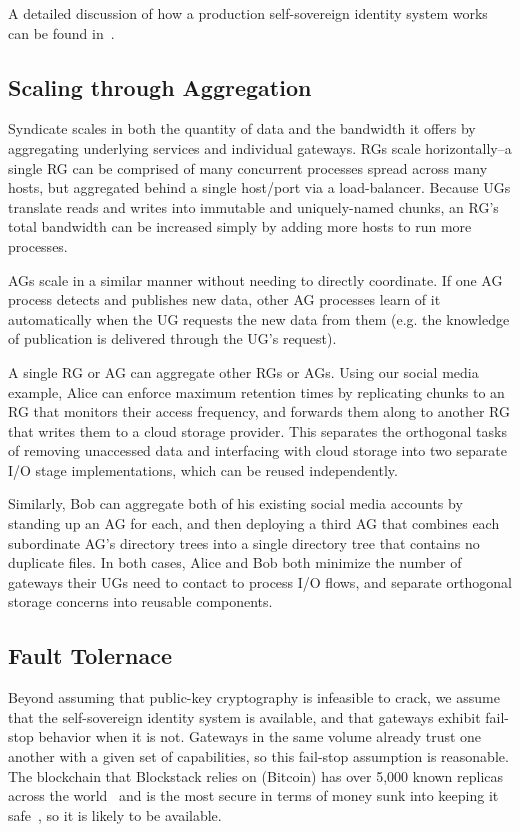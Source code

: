 A detailed discussion of how a production self-sovereign identity system
works can be found in~\cite{blockstack}.

\subsection{Scaling through Aggregation}

Syndicate scales in both the quantity of data and the bandwidth it offers by
aggregating underlying services and individual gateways. RGs scale
horizontally--a single RG can be comprised of many concurrent processes
spread across many hosts, but aggregated behind a single host/port via a
load-balancer. Because UGs translate reads and writes into immutable and
uniquely-named chunks, an RG's total bandwidth can be increased simply by
adding more hosts to run more processes.

AGs scale in a similar manner without needing to directly coordinate. If one AG
process detects and publishes new data, other AG processes learn of it
automatically when the UG requests the new data from them (e.g. the knowledge of
publication is delivered through the UG's request).

A single RG or AG can aggregate other RGs or AGs. Using our social media
example, Alice can enforce maximum retention times by replicating chunks to an
RG that monitors their access frequency, and forwards them along to another RG
that writes them to a cloud storage provider. This separates the orthogonal
tasks of removing unaccessed data and interfacing with cloud storage into two
separate I/O stage implementations, which can be reused independently.

Similarly, Bob can aggregate both of his existing social media accounts by
standing up an AG for each, and then deploying a third AG that combines each
subordinate AG's directory trees into a single directory tree that contains
no duplicate files. In both cases, Alice and Bob both minimize the number of
gateways their UGs need to contact to process I/O flows, and separate orthogonal
storage concerns into reusable components.

\subsection{Fault Tolernace}

Beyond assuming that public-key cryptography is infeasible to crack, we assume
that the self-sovereign identity system is available, and that gateways exhibit
fail-stop behavior when it is not.  Gateways in the same volume already trust one another
with a given set of capabilities, so this fail-stop assumption is
reasonable. The blockchain that Blockstack relies on (Bitcoin) has over 5,000
known replicas across the world~\cite{coindance} and is the most secure in terms
of money sunk into keeping it safe~\cite{coinmarketcap}, so it is likely to be available.

